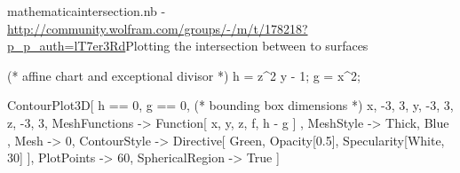 \documentclass{article}
\begin{document}
    \clearpage
    \begin{TMcode}{mathematica}{intersection.nb - \url{http://community.wolfram.com/groups/-/m/t/178218?p_p_auth=lT7er3Rd}}{Plotting the intersection between to surfaces}

    (* affine chart and exceptional divisor *)
    h = z^2 y - 1;
    g = x^2;

    ContourPlot3D[
        {h == 0, g == 0}, 
        (* bounding box dimensions *)
        {x, -3, 3}, 
        {y, -3, 3}, 
        {z, -3, 3}, 
        MeshFunctions -> {
            Function[ {x, y, z, f}, h - g ]
        }, 
        MeshStyle -> {
            { Thick, Blue }
        }, 
        Mesh -> {{0}}, 
        ContourStyle -> Directive[
                Green, Opacity[0.5], Specularity[White, 30]
        ], 
        PlotPoints -> 60,
        SphericalRegion -> True
    ]
    \end{TMcode}

    \printbibliography 
\end{document}
